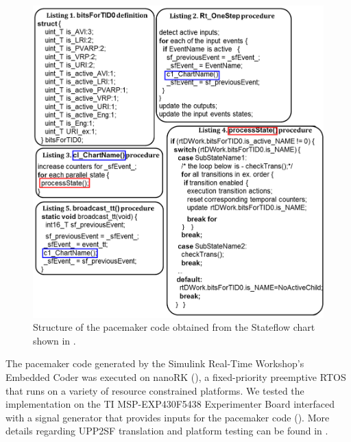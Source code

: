 \begin{figure} [!t]
\center
\includegraphics[width=\textwidth]{figs/CodeListingFinal.png}
\caption{Structure of the pacemaker code obtained from the Stateflow chart shown in .}
\label{fig:pm_code}
\end{figure}


The pacemaker code generated by the Simulink Real-Time Workshop's Embedded Coder was executed on nanoRK (\cite{nanork}), a fixed-priority preemptive RTOS that runs on a variety of resource constrained platforms. We tested the implementation on the TI MSP-EXP430F5438 Experimenter Board interfaced with a signal generator that provides inputs for the pacemaker code (). More details regarding UPP2SF translation and platform testing can be found in \cite{TECS}.

